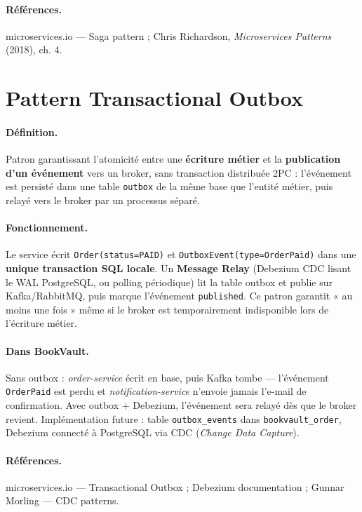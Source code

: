 \documentclass[12pt,a4paper]{report}
\begin{document}
\paragraph{Références.} microservices.io — Saga pattern ; Chris Richardson, \textit{Microservices Patterns} (2018), ch. 4.\par


\section{Pattern Transactional Outbox}

\paragraph{Définition.} Patron garantissant l'atomicité entre une \textbf{écriture métier} et la \textbf{publication d'un événement} vers un broker, sans transaction distribuée 2PC : l'événement est persisté dans une table \texttt{outbox} de la même base que l'entité métier, puis relayé vers le broker par un processus séparé.\par

\paragraph{Fonctionnement.} Le service écrit \texttt{Order(status=PAID)} et \texttt{OutboxEvent(type=OrderPaid)} dans une \textbf{unique transaction SQL locale}. Un \textbf{Message Relay} (Debezium CDC lisant le WAL PostgreSQL, ou polling périodique) lit la table outbox et publie sur Kafka/RabbitMQ, puis marque l'événement \texttt{published}. Ce patron garantit « au moins une fois » même si le broker est temporairement indisponible lors de l'écriture métier.\par

\paragraph{Dans BookVault.} Sans outbox : \textit{order-service} écrit en base, puis Kafka tombe — l'événement \texttt{OrderPaid} est perdu et \textit{notification-service} n'envoie jamais l'e-mail de confirmation. Avec outbox + Debezium, l'événement sera relayé dès que le broker revient. Implémentation future : table \texttt{outbox\_events} dans \texttt{bookvault\_order}, Debezium connecté à PostgreSQL via CDC (\textit{Change Data Capture}).\par

\paragraph{Références.} microservices.io — Transactional Outbox ; Debezium documentation ; Gunnar Morling — CDC patterns.\par
\end{document}
